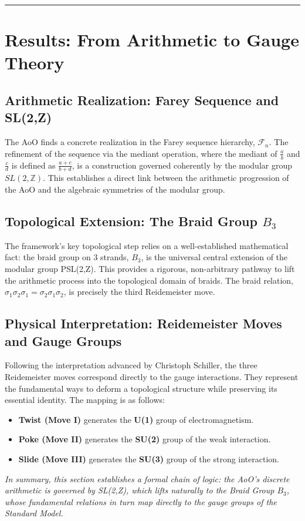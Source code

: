 \documentclass{article}
\theoremstyle{remark}
\begin{document}
\hrule
\section{Results: From Arithmetic to Gauge Theory}

\subsection{Arithmetic Realization: Farey Sequence and SL(2,Z)}
The AoO finds a concrete realization in the Farey sequence hierarchy, $\mathcal{F}_n$. The refinement of the sequence via the mediant operation, where the mediant of $\frac{a}{b}$ and $\frac{c}{d}$ is defined as $\frac{a+c}{b+d}$, is a construction governed coherently by the modular group $SL(2,\mathbb{Z})$. This establishes a direct link between the arithmetic progression of the AoO and the algebraic symmetries of the modular group.

\subsection{Topological Extension: The Braid Group $B_3$}
The framework's key topological step relies on a well-established mathematical fact: the braid group on 3 strands, $B_3$, is the universal central extension of the modular group PSL(2,Z). This provides a rigorous, non-arbitrary pathway to lift the arithmetic process into the topological domain of braids. The braid relation, $\sigma_1 \sigma_2 \sigma_1 = \sigma_2 \sigma_1 \sigma_2$, is precisely the third Reidemeister move.

\subsection{Physical Interpretation: Reidemeister Moves and Gauge Groups}
Following the interpretation advanced by Christoph Schiller, the three Reidemeister moves correspond directly to the gauge interactions. They represent the fundamental ways to deform a topological structure while preserving its essential identity. The mapping is as follows:
\begin{itemize}
    \item \textbf{Twist (Move I)} generates the \textbf{U(1)} group of electromagnetism.
    \item \textbf{Poke (Move II)} generates the \textbf{SU(2)} group of the weak interaction.
    \item \textbf{Slide (Move III)} generates the \textbf{SU(3)} group of the strong interaction.
\end{itemize}
\emph{In summary, this section establishes a formal chain of logic: the AoO's discrete arithmetic is governed by SL(2,Z), which lifts naturally to the Braid Group $B_3$, whose fundamental relations in turn map directly to the gauge groups of the Standard Model.}
\end{document}
